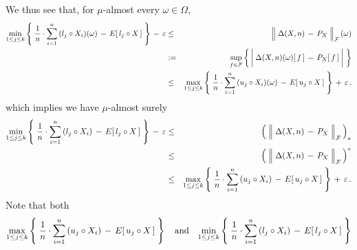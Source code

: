 We thus see that, for $\mu$-almost every $\omega \in \Omega$,
\begin{eqnarray*}
	\underset{1\leq j \leq k}{\min}\left\{\;
		\dfrac{1}{n}\cdot \overset{n}{\underset{i=1}{\sum}}\,(l_{j} \circ X_{i})(\omega)
		\,\overset{{\color{white}+}}{-}\,
		E[\,l_{j} \circ X\,]
		\;\right\}
	\,\overset{{\color{white}+}}{-}\,
	\varepsilon
& \leq &
	\left\Vert\;\Delta(X,n) \,\overset{{\color{white}.}}{-}\, P_{X}\;\right\Vert_{\mathcal{F}}(\omega)
\\
& := &
	\underset{f\in\mathcal{F}}{\sup}\left\{\,
		\left\vert\; \Delta(X,n)(\omega)[\,f\,]\,\overset{{\color{white}+}}{-}\,P_{X}[\,f\,] \;\right\vert
	\;\right\}
\\
& \leq &
	\underset{1\leq j \leq k}{\max}\left\{\;
		\dfrac{1}{n}\cdot \overset{n}{\underset{i=1}{\sum}}\,(u_{j} \circ X_{i})(\omega)
		\,\overset{{\color{white}+}}{-}\,
		E[\,u_{j} \circ X\,]
		\;\right\}
	\,\overset{{\color{white}+}}{+}\,
	\varepsilon\,.
\end{eqnarray*}
which implies we have $\mu$-almost surely
\begin{eqnarray*}
	\underset{1\leq j \leq k}{\min}\left\{\;
		\dfrac{1}{n}\cdot \overset{n}{\underset{i=1}{\sum}}\,(l_{j} \circ X_{i})
		\,\overset{{\color{white}+}}{-}\,
		E[\,l_{j} \circ X\,]
		\;\right\}
	\,\overset{{\color{white}+}}{-}\,
	\varepsilon
& \leq &
	\left(\;\left\Vert\;\Delta(X,n) \,\overset{{\color{white}.}}{-}\, P_{X}\;\right\Vert_{\mathcal{F}}\,\right)_{*}
\\
& \leq &
	\left(\;\left\Vert\;\Delta(X,n) \,\overset{{\color{white}.}}{-}\, P_{X}\;\right\Vert_{\mathcal{F}}\,\right)^{*}
\\
& \leq &
	\underset{1\leq j \leq k}{\max}\left\{\;
		\dfrac{1}{n}\cdot \overset{n}{\underset{i=1}{\sum}}\,(u_{j} \circ X_{i})
		\,\overset{{\color{white}+}}{-}\,
		E[\,u_{j} \circ X\,]
		\;\right\}
	\,\overset{{\color{white}+}}{+}\,
	\varepsilon\,.
\end{eqnarray*}
Note that both
\begin{equation*}
	\underset{1\leq j \leq k}{\max}\left\{\;
		\dfrac{1}{n}\cdot \overset{n}{\underset{i=1}{\sum}}\,(u_{j} \circ X_{i})
		\,\overset{{\color{white}+}}{-}\,
		E[\,u_{j} \circ X\,]
	\;\right\}
\quad\textnormal{and}\quad
	\underset{1\leq j \leq k}{\min}\left\{\;
		\dfrac{1}{n}\cdot \overset{n}{\underset{i=1}{\sum}}\,(l_{j} \circ X_{i})
		\,\overset{{\color{white}+}}{-}\,
		E[\,l_{j} \circ X\,]
	\;\right\}
\end{equation*}
